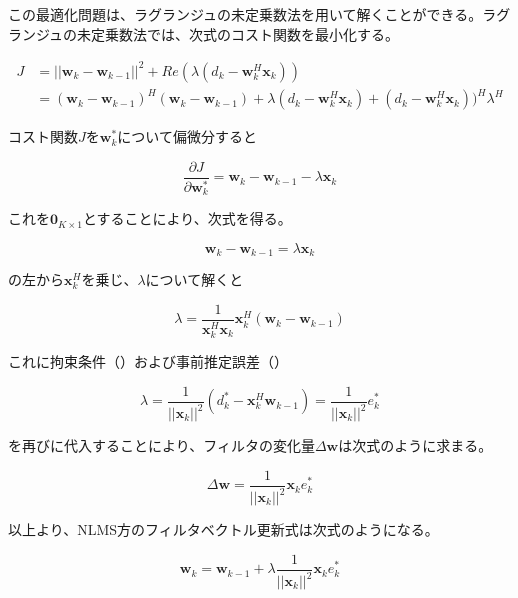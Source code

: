 この最適化問題は、ラグランジュの未定乗数法を用いて解くことができる。ラグランジュの未定乗数法では、次式のコスト関数を最小化する。

\begin{equation}
\begin{split}
J &= ||\bm{w}_k - \bm{w}_{k-1}||^2  + Re(\lambda (d_k - \bm{w}_k^H \bm{x}_k)) \\
  &= (\bm{w}_k - \bm{w}_{k-1})^H (\bm{w}_k - \bm{w}_{k-1}) + \lambda (d_k - \bm{w}_k^H \bm{x}_k) + (d_k - \bm{w}_k^H \bm{x}_k))^H \lambda^H
\end{split}
\end{equation}

コスト関数\(J\)を\(\bm{w}_k^*\)について偏微分すると

\begin{equation}
\frac{\partial J}{\partial \bm{w}_k^*} = \bm{w}_k - \bm{w}_{k-1} - \lambda \bm{x}_k
\end{equation}

これを\(\bm{0}_{K \times 1}\)とすることにより、次式を得る。

\begin{equation}
\bm{w}_k - \bm{w}_{k-1} = \lambda \bm{x}_k
\label{equ:w-w_k}
\end{equation}

の左から\(\bm{x}_k^H\)を乗じ、\(\lambda\)について解くと

\begin{equation}
\lambda = \frac{1}{\bm{x}_k^H \bm{x}_k} \bm{x}_k^H (\bm{w}_k - \bm{w}_{k-1})
\end{equation}

これに拘束条件（）および事前推定誤差（）

\begin{equation}
\lambda = \frac{1}{ ||\bm{x}_k||^2 } (d_k^* - \bm{x}_k^H \bm{w}_{k-1}) = \frac{1}{||\bm{x}_k||^2} e_k^*
\label{equ:lambda}
\end{equation}

を再びに代入することにより、フィルタの変化量\(\Delta \bm{w}\)は次式のように求まる。

\begin{equation}
\Delta \bm{w} = \frac{1}{||\bm{x}_k||^2} \bm{x}_k e_k^*
\end{equation}

以上より、NLMS方のフィルタベクトル更新式は次式のようになる。

\begin{equation}
\bm{w}_k = \bm{w}_{k-1} + \lambda \frac{1}{||\bm{x}_k||^2} \bm{x}_k e_k^*
\end{equation}

